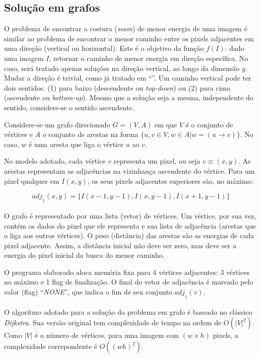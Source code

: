 \subsection{Solução em grafos}
\label{sol:graph}

O problema de encontrar a costura ({\it seam}) de menor energia de uma imagem
é similar ao problema de encontrar o menor caminho entre 
os pixels adjacentes em uma direção (vertical ou horizontal).
Este é o objetivo da função $f(I)$: dado uma imagem $I$, retornar 
o caminho de menor energia em direção específica.
No caso, será tratado apenas soluções na direção vertical, 
ao longo da dimensão $y$.
Mudar a direção é trivial, como já tratado em ``''.
Um caminho vertical pode ter dois sentidos: 
(1) para baixo (descendente ou {\it top-down}) ou
(2) para cima (ascendente ou {\it bottom-up}).
Mesmo que a solução seja a mesma, independente do sentido,
considere-se o sentido ascendente.

Considere-se um grafo direcionado $G=(V,A)$ em que $V$ é o conjunto de vértices 
e $A$ o conjunto de arestas na forma $\{u, v \in V, w \in A | w=(u \to v)\}$.
No caso, $w$ é uma aresta que liga o vértice $u$ ao $v$. 

No modelo adotado, cada vértice $v$ representa um pixel, ou seja $v \equiv (x, y)$. 
As arestas representam as adjacências na vizinhança ascendente do vértice.
Para um pixel qualquer em $I(x, y)$, 
os seus pixels adjacentes superiores são, no máximo:

\begin{equation}
\label{adj_sup}
adj_{\uparrow}(x, y) = \{I(x-1, y-1), I(x, y-1), I(x+1, y-1)\}
\end{equation}

O grafo é representado por uma lista (vetor) de vértices. 
Um vértice, por sua vez, contém os dados do pixel que ele representa e sua 
lista de adjacência (arestas que o liga aos outros vértices).
O peso (distância) das arestas são as energias de cada pixel adjacente.
Assim, a distância inicial não deve ser zero,
mas deve ser a energia do pixel inicial da busca do menor caminho. 

O programa elaborado aloca memória fixa para 4 vértices adjacentes:
3 vértices no máximo e 1 flag de finalização.
O final do vetor de adjacência é marcado pelo valor (flag) ``{\it NONE}'',
que indica o fim de seu conjunto $adj_{\uparrow}(v)$.

O algoritmo adotado para a solução do problema em grafo 
é baseado no clássico \emph{Dijkstra}.
Sua versão original tem complexidade de tempo na ordem de $O(|V|^2)$. 
Como $|V|$ é o número de vértices, para uma imagem com $(w \times h)$ pixels, 
a complexidade correpondente é $O((wh)^2)$.  

